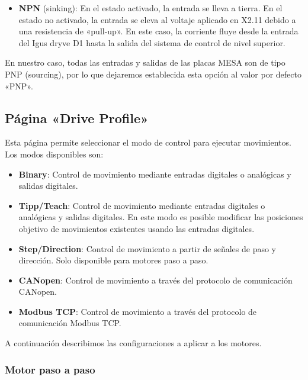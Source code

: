 \documentclass[english,spanish,a4paper,11pt]{article}
\begin{document}
\begin{itemize}
\begin{itemize}
        \item \textbf{NPN} (sinking): En el estado activado, la entrada se lleva a tierra. En el estado no activado, la entrada se eleva al voltaje aplicado en X2.11 debido a una resistencia de «pull-up». En este caso, la corriente fluye desde la entrada del Igus dryve D1 hasta la salida del sistema de control de nivel superior.
    \end{itemize}

    En nuestro caso, todas las entradas y salidas de las placas MESA son de tipo PNP (sourcing), por lo que dejaremos establecida esta opción al valor por defecto «PNP».
\end{itemize}


\subsection{Página «Drive Profile»}
\label{sec:page_drive_profile}

Esta página permite seleccionar el modo de control para ejecutar movimientos.
Los modos disponibles son:

\begin{itemize}
    \item \textbf{Binary}: Control de movimiento mediante entradas digitales o analógicas y salidas digitales.
    
    \item \textbf{Tipp/Teach}: Control de movimiento mediante entradas digitales o analógicas y salidas digitales. En este modo es posible modificar las posiciones objetivo de movimientos existentes usando las entradas digitales.
    
    \item \textbf{Step/Direction}: Control de movimiento a partir de señales de paso y dirección. Solo disponible para motores paso a paso.
    
    \item \textbf{CANopen}: Control de movimiento a través del protocolo de comunicación CANopen.
    
    \item \textbf{Modbus TCP}: Control de movimiento a través del protocolo de comunicación Modbus TCP.
\end{itemize}

A continuación describimos las configuraciones a aplicar a los motores.


\subsubsection{Motor paso a paso}
\end{document}
